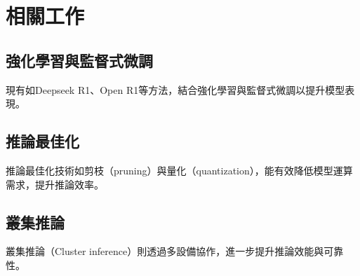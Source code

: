 \section{相關工作}
\subsection{強化學習與監督式微調}
現有如Deepseek R1、Open R1等方法，結合強化學習與監督式微調以提升模型表現。

\subsection{推論最佳化}
推論最佳化技術如剪枝（pruning）與量化（quantization），能有效降低模型運算需求，提升推論效率。

\subsection{叢集推論}
叢集推論（Cluster inference）則透過多設備協作，進一步提升推論效能與可靠性。
